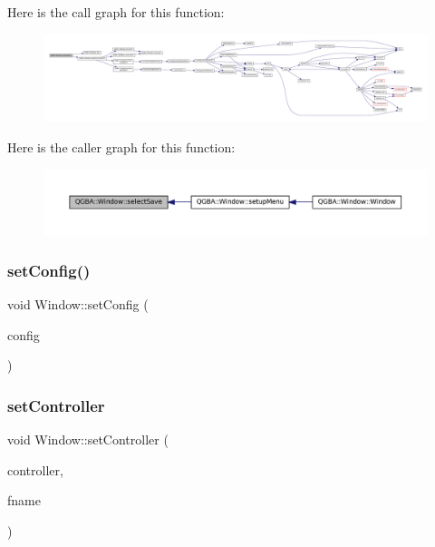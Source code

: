 Here is the call graph for this function\+:
\nopagebreak
\begin{figure}[H]
\begin{center}
\leavevmode
\includegraphics[width=350pt]{class_q_g_b_a_1_1_window_a5b8372017cd7411b77a865eca2078b75_cgraph}
\end{center}
\end{figure}
Here is the caller graph for this function\+:
\nopagebreak
\begin{figure}[H]
\begin{center}
\leavevmode
\includegraphics[width=350pt]{class_q_g_b_a_1_1_window_a5b8372017cd7411b77a865eca2078b75_icgraph}
\end{center}
\end{figure}
\mbox{\label{class_q_g_b_a_1_1_window_ae4f2cabe0032595068a69b724ecc13c5}} 
\subsubsection{\texorpdfstring{set\+Config()}{setConfig()}}
{\footnotesize\ttfamily void Window\+::set\+Config (\begin{DoxyParamCaption}\item[{\mbox{\hyperlink{class_q_g_b_a_1_1_config_controller}{Config\+Controller}} $\ast$}]{config }\end{DoxyParamCaption})}

\mbox{\label{class_q_g_b_a_1_1_window_abe01a1ebe877d333fb60c3f0fc621f0c}} 
\subsubsection{\texorpdfstring{set\+Controller}{setController}}
{\footnotesize\ttfamily void Window\+::set\+Controller (\begin{DoxyParamCaption}\item[{\mbox{\hyperlink{class_q_g_b_a_1_1_core_controller}{Core\+Controller}} $\ast$}]{controller,  }\item[{const Q\+String \&}]{fname }\end{DoxyParamCaption})\hspace{0.3cm}{\ttfamily [slot]}}

